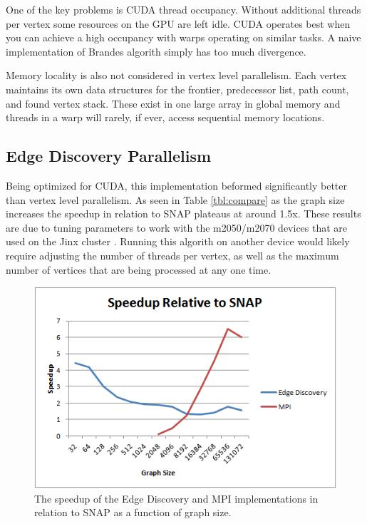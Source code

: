 \documentclass[10pt,twocolumn]{article}
\begin{document}
One of the key problems is CUDA thread occupancy. Without additional threads per vertex some resources on the GPU are left idle. CUDA operates best when you can achieve a high occupancy with warps operating on similar tasks. A naive implementation of Brandes algorith simply has too much divergence.

Memory locality is also not considered in vertex level parallelism. Each vertex maintains its own data structures for the frontier, predecessor list, path count, and found vertex stack. These exist in one large array in global memory and threads in a warp will rarely, if ever, access sequential memory locations.

\subsection{Edge Discovery Parallelism}
Being optimized for CUDA, this implementation beformed significantly better than vertex level parallelism. As seen in Table \ref{tbl:compare} as the graph size increases the speedup in relation to SNAP plateaus at around 1.5x. These results are due to tuning parameters to work with the m2050/m2070 devices that are used on the Jinx cluster \cite{jinx}. Running this algorith on another device would likely require adjusting the number of threads per vertex, as well as the maximum number of vertices that are being processed at any one time.

\begin{figure}[htbp]
\centering
\includegraphics[scale=.6]{speedup.png}
\caption{The speedup of the Edge Discovery and MPI implementations in relation to SNAP as a function of graph size.}
\label{fig:speedup}
\end{figure}
\end{document}
